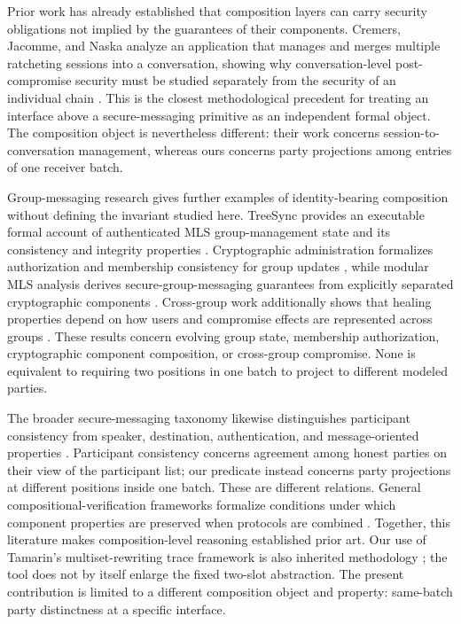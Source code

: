 Prior work has already established that composition layers can carry security
obligations not implied by the guarantees of their components. Cremers,
Jacomme, and Naska analyze an application that manages and merges multiple
ratcheting sessions into a conversation, showing why conversation-level
post-compromise security must be studied separately from the security of an
individual chain \cite{cremers2023session}. This is the closest methodological
precedent for treating an interface above a secure-messaging primitive as an
independent formal object. The composition object is nevertheless different:
their work concerns session-to-conversation management, whereas ours concerns
party projections among entries of one receiver batch.

Group-messaging research gives further examples of identity-bearing
composition without defining the invariant studied here. TreeSync provides an
executable formal account of authenticated MLS group-management state and its
consistency and integrity properties \cite{wallez2023treesync}. Cryptographic
administration formalizes authorization and membership consistency for group
updates \cite{balbas2023administration}, while modular MLS analysis derives
secure-group-messaging guarantees from explicitly separated cryptographic
components \cite{alwen2021modular}. Cross-group work additionally shows that
healing properties depend on how users and compromise effects are represented
across groups \cite{cremers2021healing}. These results concern evolving group
state, membership authorization, cryptographic component composition, or
cross-group compromise. None is equivalent to requiring two positions in one
\batchreceive batch to project to different modeled parties.

The broader secure-messaging taxonomy likewise distinguishes participant
consistency from speaker, destination, authentication, and message-oriented
properties \cite{unger2015sok}. Participant consistency concerns agreement
among honest parties on their view of the participant list; our predicate
instead concerns party projections at different positions inside one batch.
These are different relations. General compositional-verification frameworks
formalize conditions under which component properties are preserved when
protocols are combined \cite{andova2008compositional}. Together, this
literature makes composition-level reasoning established prior art. Our use of
Tamarin's multiset-rewriting trace framework is also inherited methodology
\cite{meier2013tamarin}; the tool does not by itself enlarge the fixed
two-slot abstraction. The present contribution is limited to a different
composition object and property: same-batch party distinctness at a specific
\kwaay interface.

